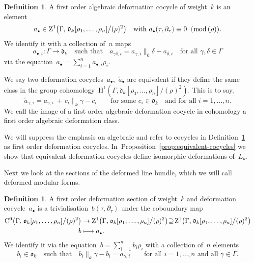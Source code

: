 \documentclass[10pt,a4paper]{article}
\numberwithin{equation}{section}
\let\oldbullet\bullet
\renewcommand{\bullet}{{\scriptscriptstyle\oldbullet}}
\theoremstyle{plain}
\theoremstyle{definition}
\newtheorem{definition}[theoremcounter]{Definition}
\newcommand{\tx}{\text}
\newcommand{\frakd}{\ensuremath{\mathfrak{d}}}
\newcommand{\frako}{\ensuremath{\mathfrak{o}}}
\newcommand{\rmC}{\ensuremath{\mathrm{C}}}
\newcommand{\rmH}{\ensuremath{\mathrm{H}}}
\newcommand{\rmZ}{\ensuremath{\mathrm{Z}}}
\newcommand{\defcol}{\mathrel{:}}
\renewcommand{\pmod}[1]{\;(\mathrm{mod}\, #1)}
\let\Ga\Gamma
\let\ga\gamma
\newcommand\mto{\mathchoice{\longmapsto}{\mapsto}{\mapsto}{\mapsto}}
\begin{document}
\begin{definition}
\label{def:first_order_deformation_cocycle}
A first order algebraic deformation cocycle of weight~$k$ is an element
\begin{equation*}
a_\bullet
\in
\rmZ^1\bigl(\Ga,\, \frakd_k[\rho_1, \ldots, \rho_n] \big\slash (\rho)^2 \bigr)
\quad\tx{with\ }
a_\bullet(\tau,\partial_\tau)
\equiv
0
\;\pmod{(\rho)}
\tx{.}
\end{equation*}
We identify it with a collection of~$n$ maps
\begin{equation*}
a_{\bullet,i} \defcol \Ga \to \frakd_k
\quad\tx{such that}\quad
a_{\ga\delta,i} = a_{\ga,i}\big\|_k \delta + a_{\delta,i}
\quad
\tx{for all\ }\ga, \delta \in \Ga
\end{equation*}
via the equation~$a_\bullet = \sum_{i=1}^n a_{\bullet,i} \rho_i$.

We say two deformation cocycles~$a_{\bullet}$,~$\tilde{a}_{\bullet}$ are equivalent if they define the same class in the group cohomology~$\rmH^1(\Ga, \frakd_k[\rho_1,\ldots,\rho_n] \slash (\rho)^2)$. This is to say,
\begin{equation*}
\tilde{a}_{\ga,i}
=
a_{\ga,i}
\,+\,
c_i\big\|_k\ga - c_i
\qquad
\tx{for some\ }
c_i\in\frakd_k
\quad
\tx{and for all~$i=1,\ldots,n$.}
\end{equation*}
We call the image of a first order algebraic deformation cocycle in cohomology a first order algebraic deformation class.
\end{definition}

We will suppress the emphasis on algebraic and refer to cocycles in Definition~\ref{def:first_order_deformation_cocycle} as first order deformation cocycles. In~Proposition~\ref{prop:equivalent-cocycles} we show that equivalent deformation cocycles define isomorphic deformations of\/~$L_k$.

Next we look at the sections of the deformed line bundle, which we will call deformed modular forms.

\begin{definition}
\label{def:first_order_deformation_section}
A first order deformation section of weight~$k$ and deformation cocycle~$a_{\bullet}$ is a trivialisation~$b(\tau,\partial_\tau)$ under the coboundary map
\begin{align*}
\rmC^0\bigl(\Ga,\mkern2mu \frako_k[\rho_1,\ldots,\rho_n] \big\slash (\rho)^2 \bigr)
&
\to{}
\rmZ^1\bigl(\Ga,\mkern2mu \frako_k[\rho_1,\ldots,\rho_n] \big\slash (\rho)^2 \bigr)
\!\supseteq\!
\rmZ^1\bigl(\Ga,\mkern2mu \frakd_k[\rho_1,\ldots,\rho_n] \big\slash (\rho)^2 \bigr)
\\
b
&\mto
a_\bullet
\tx{.}
\end{align*}
We identify it via the equation~$b = \sum_{i=1}^n b_i \rho_i$ with a collection of~$n$ elements
\begin{equation*}
b_i \in \frako_k
\quad\tx{such that}\quad
b_i\big\|_k\ga - b_i = a_{\ga,i}
\qquad
\tx{for all~$i=1,\ldots,n$ and all~$\ga\in\Ga$.}
\end{equation*}
\end{definition}
\end{document}
